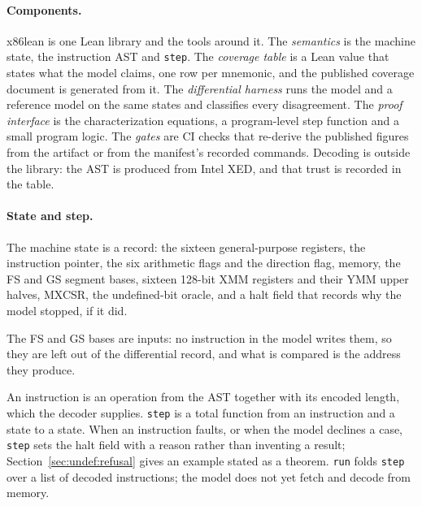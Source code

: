 \documentclass[runningheads]{llncs}
\newcommand{\src}[1]{}  %
\newcommand{\lean}[1]{\texttt{#1}}
\begin{document}
\paragraph{Components.}
x86lean is one Lean library and the tools around it. The \emph{semantics} is the machine state, the instruction
AST and \lean{step}. The \emph{coverage table} is a Lean value that states what the model claims, one row per
mnemonic, and the published coverage document is generated from it. The \emph{differential harness} runs the model
and a reference model on the same states and classifies every disagreement. The \emph{proof interface} is the
characterization equations, a program-level step function and a small program logic. The \emph{gates} are CI checks
that re-derive the published figures from the artifact or from the manifest's recorded commands. Decoding is outside the library: the AST is produced from
Intel XED, and that trust is recorded in the table.
\src{X86/State.lean structure Cpu; X86/Syntax.lean structure Instr; X86/Semantics.lean step; X86/Coverage.lean;
Main.lean, the comparator; X86/Theorems.lean; X86/Program.lean stepP; X86/Logic.lean Spec; .github/workflows/ci.yml;
TRUSTBASE.md, Decode trust}

\paragraph{State and step.}
The machine state is a record: the sixteen general-purpose registers, the instruction pointer, the six arithmetic flags and the direction flag, memory, the FS and GS segment bases, sixteen 128-bit XMM registers and their YMM upper halves, MXCSR, the undefined-bit
oracle, and a halt field that records why the model stopped, if it did.
\src{X86/State.lean structure Cpu; X86/Basic.lean GPR and Xmms (its field hi : YmmHi, bits 255:128, D341)}
The FS and GS bases are inputs: no instruction in the model writes them, so they are left out of the
differential record, and what is compared is the address they produce.
\src{X86/State.lean, the fsBase/gsBase docstring}
An instruction is an operation from the AST together with its encoded length, which the decoder
supplies. \lean{step} is a total function from an instruction and a state to a state. When an
instruction faults, or when the model declines a case, \lean{step} sets the halt field with a reason
rather than inventing a result; Section~\ref{sec:undef:refusal} gives an
example stated as a theorem. \lean{run} folds \lean{step} over a list of decoded instructions; the
model does not yet fetch and decode from memory.
\src{X86/Syntax.lean structure Instr; X86/Semantics.lean step and run}
\end{document}
